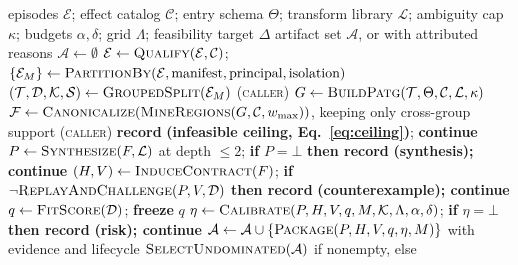 \begin{algorithm}[t]
\caption{\textsc{Compile} --- the compile-or-retire cascade. Every candidate is either
registered or assigned an attributed \retire, so refusal accounting remains explicit.
Stages marked \textsc{(caller)} are separate library entry points run in this order
rather than steps inside one function.}
\label{alg:compile}
\footnotesize
\begin{algorithmic}[1]
\Require episodes $\mathcal{E}$; effect catalog $\mathcal{C}$; entry schema $\Theta$;
         transform library $\mathcal{L}$; ambiguity cap $\kappa$; budgets $\alpha,\delta$;
         grid $\Lambda$; feasibility target $\Delta$
\Ensure artifact set $\mathcal{A}$, or \retire{} with attributed reasons
\State $\mathcal{A}\gets\emptyset$
\State $\mathcal{E}\gets\textsc{Qualify}(\mathcal{E},\mathcal{C})$;\quad
       $\{\mathcal{E}_M\}\gets\textsc{PartitionBy}(\mathcal{E},\text{manifest},
       \text{principal},\text{isolation})$
  \State $(\mathcal{T},\mathcal{D},\mathcal{K},\mathcal{S})\gets
         \textsc{GroupedSplit}(\mathcal{E}_M)$ \hfill\textsc{(caller)}
  \State $G\gets\textsc{BuildPatg}(\mathcal{T},\Theta,\mathcal{C},\mathcal{L},\kappa)$ 
  \State $\mathcal{F}\gets\textsc{Canonicalize}(\textsc{MineRegions}
         (G,\mathcal{C},w_{\max}))$, keeping only cross-group support
   \hfill\textsc{(caller)}
     \State \textbf{record} \retire{} \textbf{(infeasible ceiling, Eq.~\ref{eq:ceiling})};
            \textbf{continue}
  \EndIf
    \State $P\gets\textsc{Synthesize}(F,\mathcal{L})$ at depth $\le 2$;\quad
           \textbf{if} $P=\bot$ \textbf{then record} \retire{} \textbf{(synthesis); continue}
    \State $(H,V)\gets\textsc{InduceContract}(F)$;\quad
           \textbf{if} $\neg\textsc{ReplayAndChallenge}(P,V,\mathcal{D})$
           \textbf{then record} \retire{} \textbf{(counterexample); continue}
    \State $q\gets\textsc{FitScore}(\mathcal{D})$; \textbf{freeze} $q$
    \State $\eta\gets\textsc{Calibrate}(P,H,V,q,M,\mathcal{K},\Lambda,\alpha,\delta)$;\quad
           \textbf{if} $\eta=\bot$ \textbf{then record} \retire{} \textbf{(risk); continue}
    \State $\mathcal{A}\gets\mathcal{A}\cup
           \{\textsc{Package}(P,H,V,q,\eta,M)\}$ with evidence and lifecycle
  \EndFor
\EndFor
\State \Return $\textsc{SelectUndominated}(\mathcal{A})$ if nonempty, else \retire
\end{algorithmic}
\end{algorithm}
